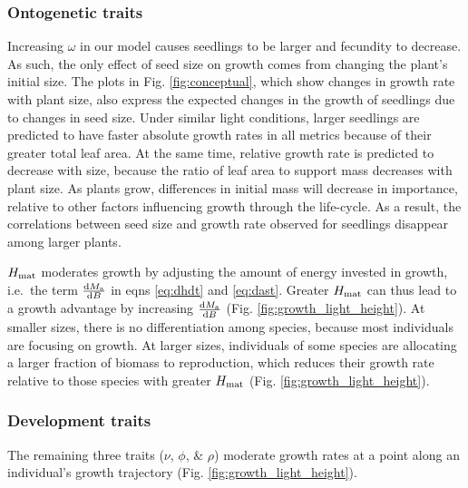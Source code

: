 \documentclass[a4paper,11pt]{article}
\begin{document}
\subsubsection{Ontogenetic traits}

Increasing $\omega$ in our model causes seedlings to be larger and fecundity to decrease. As such, the only effect of seed size on growth comes from changing the plant's initial  size. The plots in Fig. \ref{fig:conceptual}, which show changes in growth rate with plant size, also express the expected changes in the growth of seedlings due to changes in seed size. Under similar light conditions, larger seedlings are predicted to have faster absolute growth rates in all metrics  because of their greater total leaf area. At the same time, relative growth rate is predicted to decrease with size, because the ratio of leaf area to support mass decreases with plant size. As plants grow, differences in initial mass will decrease in importance, relative to other factors influencing growth through the life-cycle. As a result, the correlations between seed size and growth rate observed for seedlings disappear among larger plants.

$H_{{\rm mat}}$ moderates growth by adjusting the amount of energy invested in growth, i.e.~the term $\frac{{\rm d}M_{\rm a}}{{\rm d}B}$ in eqns \ref{eq:dhdt} and \ref{eq:dast}. Greater $H_{{\rm mat}}$ can thus lead to a growth advantage by increasing $\frac{{\rm d}M_{\rm a}}{{\rm d}B}$ (Fig. \ref{fig:growth_light_height}). At smaller sizes, there is no differentiation among species, because most individuals are focusing on growth. At larger sizes, individuals of some species are allocating a larger fraction of biomass to reproduction, which reduces their growth rate relative to those species with greater $H_{{\rm mat}}$ (Fig. \ref{fig:growth_light_height}).

\subsubsection{Development traits}

The remaining three traits ($\nu$, $\phi$, \& $\rho$) moderate growth rates at a point along an individual's growth trajectory (Fig. \ref{fig:growth_light_height}).

\end{document}
